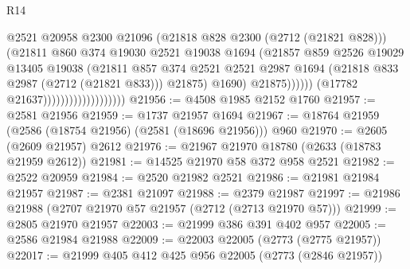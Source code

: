 \begin{lexlean}{R14}
\begin{coremodule}
                                                  @2521
                                                  @20958
                                                  @2300
                                                  @21096
                                                  (@21818 @828 @2300 (@2712 (@21821 @828)))
                                                  (@21811
                                                    @860
                                                    @374
                                                    @19030
                                                    @2521
                                                    @19038
                                                    @1694
                                                    (@21857
                                                      @859
                                                      @2526
                                                      @19029
                                                      @13405
                                                      @19038
                                                      (@21811
                                                        @857
                                                        @374
                                                        @2521
                                                        @2521
                                                        @2987
                                                        @1694
                                                        (@21818 @833 @2987 (@2712 (@21821 @833)))
                                                        @21875)
                                                      @1690)
                                                    @21875))))))
                                        (@17782 @21637)))))))))))))))))))
@21956 := @4508 @1985 @2152 @1760
@21957 := @2581 @21956
@21959 := @1737 @21957 @1694
@21967 := @18764 @21959 (@2586 (@18754 @21956) (@2581 (@18696 @21956))) @960
@21970 := @2605 (@2609 @21957) @2612
@21976 := @21967 @21970 @18780 (@2633 (@18783 @21959 @2612))
@21981 := @14525 @21970 @58 @372 @958 @2521
@21982 := @2522 @20959
@21984 := @2520 @21982 @2521
@21986 := @21981 @21984 @21957
@21987 := @2381 @21097
@21988 := @2379 @21987
@21997 := @21986 @21988 (@2707 @21970 @57 @21957 (@2712 (@2713 @21970 @57)))
@21999 := @2805 @21970 @21957
@22003 := @21999 @386 @391 @402 @957
@22005 := @2586 @21984 @21988
@22009 := @22003 @22005 (@2773 (@2775 @21957))
@22017 := @21999 @405 @412 @425 @956 @22005 (@2773 (@2846 @21957))

\end{coremodule}
\end{lexlean}
